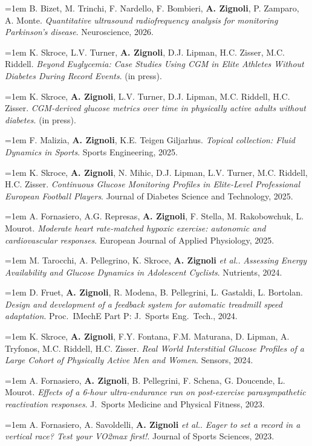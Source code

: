 \documentclass[10pt,a4paper]{article}
\newcommand{\pub}[3]{%
  \hangindent=1em\hangafter=1
  \small #1. \textit{#2}. #3.\par\vspace{3pt}%
}
\begin{document}
\pub{B. Bizet, M. Trinchi, F. Nardello, F. Bombieri, \textbf{A. Zignoli}, P. Zamparo, A. Monte}{Quantitative ultrasound radiofrequency analysis for monitoring Parkinson's disease}{Neuroscience, 2026}

\pub{K. Skroce, L.V. Turner, \textbf{A. Zignoli}, D.J. Lipman, H.C. Zisser, M.C. Riddell}{Beyond Euglycemia: Case Studies Using CGM in Elite Athletes Without Diabetes During Record Events}{(in press)}

\pub{K. Skroce, \textbf{A. Zignoli}, L.V. Turner, D.J. Lipman, M.C. Riddell, H.C. Zisser}{CGM-derived glucose metrics over time in physically active adults without diabetes}{(in press)}

\pub{F. Malizia, \textbf{A. Zignoli}, K.E. Teigen Giljarhus}{Topical collection: Fluid Dynamics in Sports}{Sports Engineering, 2025}

\pub{K. Skroce, \textbf{A. Zignoli}, N. Mihic, D.J. Lipman, L.V. Turner, M.C. Riddell, H.C. Zisser}{Continuous Glucose Monitoring Profiles in Elite-Level Professional European Football Players}{Journal of Diabetes Science and Technology, 2025}

\pub{A. Fornasiero, A.G. Represas, \textbf{A. Zignoli}, F. Stella, M. Rakobowchuk, L. Mourot}{Moderate heart rate-matched hypoxic exercise: autonomic and cardiovascular responses}{European Journal of Applied Physiology, 2025}

\pub{M. Tarocchi, A. Pellegrino, K. Skroce, \textbf{A. Zignoli} \textit{et al.}}{Assessing Energy Availability and Glucose Dynamics in Adolescent Cyclists}{Nutrients, 2024}

\pub{D. Fruet, \textbf{A. Zignoli}, R. Modena, B. Pellegrini, L. Gastaldi, L. Bortolan}{Design and development of a feedback system for automatic treadmill speed adaptation}{Proc.\ IMechE Part P: J.\ Sports Eng.\ Tech., 2024}

\pub{K. Skroce, \textbf{A. Zignoli}, F.Y. Fontana, F.M. Maturana, D. Lipman, A. Tryfonos, M.C. Riddell, H.C. Zisser}{Real World Interstitial Glucose Profiles of a Large Cohort of Physically Active Men and Women}{Sensors, 2024}

\pub{A. Fornasiero, \textbf{A. Zignoli}, B. Pellegrini, F. Schena, G. Doucende, L. Mourot}{Effects of a 6-hour ultra-endurance run on post-exercise parasympathetic reactivation responses}{J.\ Sports Medicine and Physical Fitness, 2023}

\pub{A. Fornasiero, A. Savoldelli, \textbf{A. Zignoli} \textit{et al.}}{Eager to set a record in a vertical race? Test your VO2max first!}{Journal of Sports Sciences, 2023}
\end{document}
